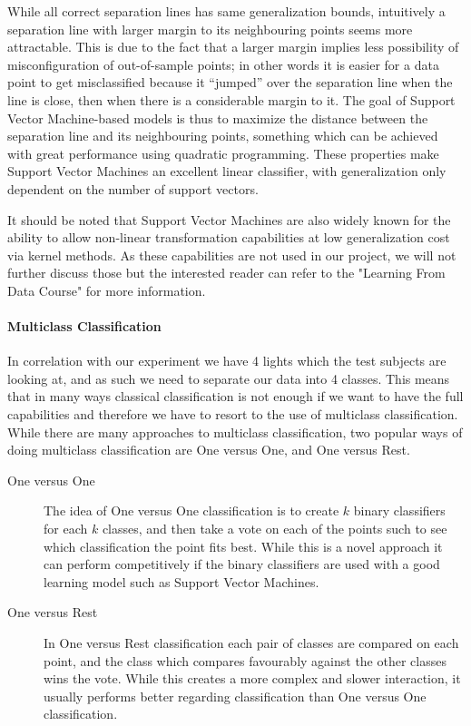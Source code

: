 While all correct separation lines has same generalization bounds, intuitively a separation line with larger margin to its neighbouring points seems more attractable.
This is due to the fact that a larger margin implies less possibility of misconfiguration of out-of-sample points; in other words it is easier for a data point to get
misclassified because it ``jumped'' over the separation line when the line is close, then when there is a considerable margin to it.
The goal of Support Vector Machine-based models is thus to maximize the distance between the separation line and its neighbouring points,
something which can be achieved with great performance using quadratic programming\cite{learningfromdata2012course}\cite{frank2006algorithm}. 
These properties make Support Vector Machines an excellent linear classifier, with generalization only dependent on the number of support vectors.

It should be noted that Support Vector Machines are also widely known for the ability
to allow non-linear transformation capabilities at low generalization cost via kernel methods. As these capabilities are not used in our project, we will not further
discuss those but the interested reader can refer to the "Learning From Data Course"\cite{learningfromdata2012course} for more information.

\paragraph{Multiclass Classification}
\label{par:MulticlassClassification}
In correlation with our experiment we have 4 lights which the test subjects are looking at, and as such we need to separate our data into 4 classes.
This means that in many ways classical classification is not enough if we want to have the full capabilities and therefore we have to resort to the use
of multiclass classification. While there are many approaches to multiclass classification,
two popular ways of doing multiclass classification are One versus One, and One versus Rest\cite{aly2005survey}\cite{scikitlearn2012multiclass}.
\begin{description}
  \item[One versus One] The idea of One versus One classification is to create $k$ binary classifiers for each $k$ classes,
    and then take a vote on each of the points such to see which classification the point fits best.
    While this is a novel approach it can perform competitively if the binary classifiers are used with a good learning model such as Support Vector Machines.
  \item[One versus Rest] In One versus Rest classification each pair of classes are compared on each point, and the class which compares favourably against the other classes
    wins the vote. While this creates a more complex and slower interaction, it usually performs better regarding classification than One versus One classification.
\end{description}

